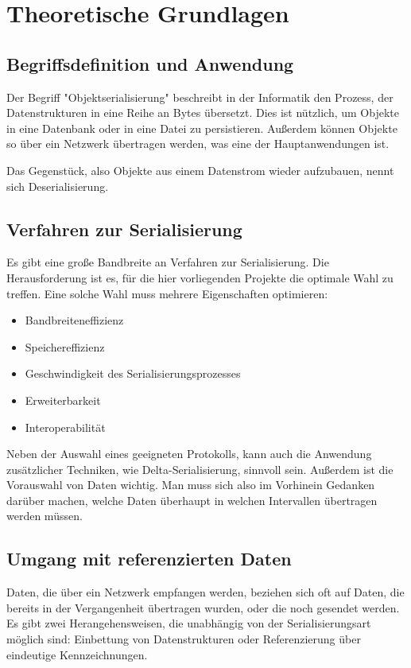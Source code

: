 
\chapter{Theoretische Grundlagen}
\section{Begriffsdefinition und Anwendung}

Der Begriff "Objektserialisierung" beschreibt in der Informatik den Prozess, der Datenstrukturen in eine Reihe an Bytes übersetzt. Dies ist nützlich, um Objekte in eine Datenbank oder in eine Datei zu persistieren. Außerdem können Objekte so über ein Netzwerk übertragen werden, was eine der Hauptanwendungen ist. \cite{SerialisationIntroduction}

Das Gegenstück, also Objekte aus einem Datenstrom wieder aufzubauen, nennt sich Deserialisierung.

\section{Verfahren zur Serialisierung}

Es gibt eine große Bandbreite an Verfahren zur Serialisierung. Die Herausforderung ist es, für die hier vorliegenden Projekte die optimale Wahl zu treffen. Eine solche Wahl muss mehrere Eigenschaften optimieren:

\begin{itemize}
	\item Bandbreiteneffizienz
	\item Speichereffizienz
	\item Geschwindigkeit des Serialisierungsprozesses
	\item Erweiterbarkeit
	\item Interoperabilität
\end{itemize}

Neben der Auswahl eines geeigneten Protokolls, kann auch die Anwendung zusätzlicher Techniken, wie Delta-Serialisierung, sinnvoll sein. Außerdem ist die Vorauswahl von Daten wichtig. Man muss sich also im Vorhinein Gedanken darüber machen, welche Daten überhaupt in welchen Intervallen übertragen werden müssen.

\section{Umgang mit referenzierten Daten}

Daten, die über ein Netzwerk empfangen werden, beziehen sich oft auf Daten, die bereits in der Vergangenheit übertragen wurden, oder die noch gesendet werden. Es gibt zwei Herangehensweisen, die unabhängig von der Serialisierungsart möglich sind: Einbettung von Datenstrukturen oder Referenzierung über eindeutige Kennzeichnungen.

